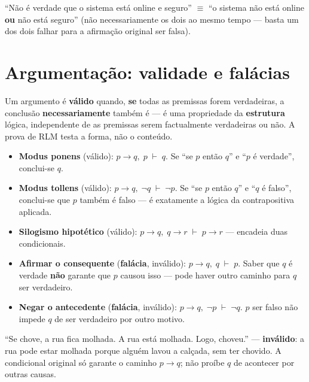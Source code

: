\begin{exemplo}
“Não é verdade que o sistema está online e seguro” $\equiv$ “o sistema não
está online \textbf{ou} não está seguro” (não necessariamente os dois ao
mesmo tempo --- basta um dos dois falhar para a afirmação original ser
falsa).
\end{exemplo}

\section{Argumentação: validade e falácias}

\begin{conceito}
Um argumento é \textbf{válido} quando, \textbf{se} todas as premissas forem
verdadeiras, a conclusão \textbf{necessariamente} também é --- é uma
propriedade da \textbf{estrutura} lógica, independente de as premissas
serem factualmente verdadeiras ou não. A prova de RLM testa a forma, não o
conteúdo.
\end{conceito}

\begin{conceito}
\begin{itemize}
\item \textbf{Modus ponens} (válido): $p \to q,\; p \;\vdash\; q$. Se “se
$p$ então $q$” e “$p$ é verdade”, conclui-se $q$.
\item \textbf{Modus tollens} (válido): $p \to q,\; \lnot q \;\vdash\;
\lnot p$. Se “se $p$ então $q$” e “$q$ é falso”, conclui-se que $p$
também é falso --- é exatamente a lógica da contrapositiva aplicada.
\item \textbf{Silogismo hipotético} (válido): $p \to q,\; q \to r
\;\vdash\; p \to r$ --- encadeia duas condicionais.
\item \textbf{Afirmar o consequente} (\textbf{falácia}, inválido): $p \to
q,\; q \;\vdash\; p$. Saber que $q$ é verdade \textbf{não} garante que $p$
causou isso --- pode haver outro caminho para $q$ ser verdadeiro.
\item \textbf{Negar o antecedente} (\textbf{falácia}, inválido): $p \to q,\;
\lnot p \;\vdash\; \lnot q$. $p$ ser falso não impede $q$ de ser
verdadeiro por outro motivo.
\end{itemize}
\end{conceito}

\begin{exemplo}
“Se chove, a rua fica molhada. A rua está molhada. Logo, choveu.” ---
\textbf{inválido}: a rua pode estar molhada porque alguém lavou a calçada,
sem ter chovido. A condicional original só garante o caminho $p \to q$; não
proíbe $q$ de acontecer por outras causas.
\end{exemplo}

